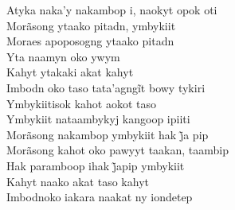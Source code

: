 \begin{linenumbers}\begingroup\raggedright

\noindent   Atyka naka'y nakambop i, naokyt opok oti\\
  Morãsong ytaako pitadn, ymbykiit\\
  Moraes apoposogng ytaako pitadn\\
  Yta naamyn oko ywym\\
  Kahyt ytakaki akat kahyt\\
  Imbodn oko taso tata’agngĩt bowy tykiri\\
  Ymbykiitisok kahot aokot taso\\
  Ymbykiit nataambykyj kangoop ipiiti\\
  Morãsong nakambop ymbykiit hak j̃a pip\\
  Morãsong kahot oko pawyyt taakan, taambip\\
  Hak paramboop ihak j̃apip ymbykiit\\
  Kahyt naako akat taso kahyt\\
  Imbodnoko iakara naakat ny iondetep
\end{linenumbers}\endgroup
